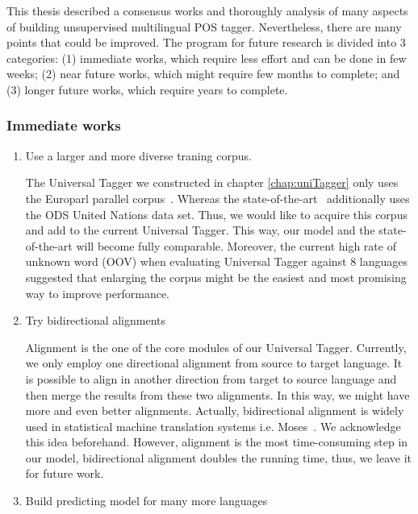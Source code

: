 This thesis described a consensus works and thoroughly analysis of many aspects of building unsupervised multilingual POS tagger. Nevertheless, there are many points that could be improved. The program for future research is divided into 3 categories: (1) immediate works, which require less effort and can be done in few weeks; (2) near future works, which might require few months to complete; and (3) longer future works, which require years to complete. 
\subsubsection{Immediate works}
\begin{enumerate}
\itemsep0pt
\item Use a larger and more diverse traning corpus. 

The Universal Tagger we constructed in chapter \ref{chap:uniTagger} only uses the Europarl parallel corpus~\cite{europarl}. Whereas the state-of-the-art~\cite{Das:2011} additionally uses the ODS United Nations data set. Thus, we would like to acquire this corpus and add to the current Universal Tagger. This way, our model and the state-of-the-art will become fully comparable. Moreover, the current high rate of unknown word (OOV) when evaluating Universal Tagger against 8 languages suggested that enlarging the corpus might be the easiest and most promising way to improve performance. 

\item Try bidirectional alignments

Alignment is the one of the core modules of our Universal Tagger. Currently, we only employ one directional alignment from source to target language. It is possible to align in another direction from target to source language and then merge the results from these two alignments. In this way, we might have more and even better alignments. Actually, bidirectional alignment is widely used in statistical machine translation systems i.e. Moses~\cite{Koehn:2007:MOS}. We acknowledge this idea beforehand. However, alignment is the most time-consuming step in our model, bidirectional alignment doubles the running time, thus, we leave it for future work. 

\item Build predicting model for many more languages


\end{enumerate}
